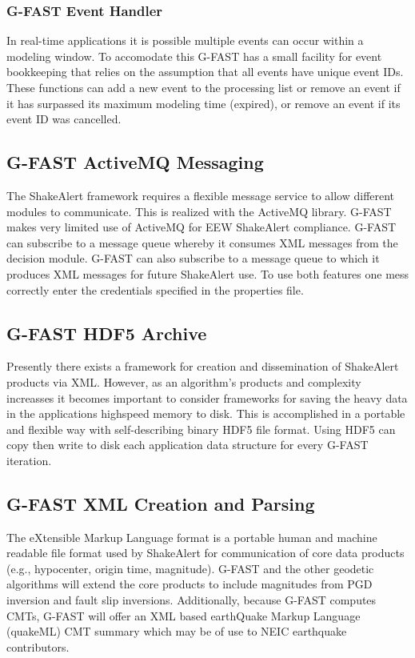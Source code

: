 \documentclass[12pt]{article}
\begin{document}
\subsubsection{G-FAST Event Handler}
In real-time applications it is possible multiple events can occur within a modeling window.  
To accomodate this G-FAST has a small facility for event bookkeeping that
relies on the assumption that all events have unique event IDs.  
These functions can add a new event to the processing list or remove an event if it has surpassed
its maximum modeling time (expired), or remove an event if its event ID was cancelled.

\subsection{G-FAST ActiveMQ Messaging}\label{ss:gfastActiveMQ}
The ShakeAlert framework requires a flexible message service to allow different modules to
communicate.  This is realized with the ActiveMQ library.  G-FAST makes very limited use of
ActiveMQ for EEW ShakeAlert compliance.  G-FAST can subscribe to a message queue whereby it
consumes XML messages from the decision module.  
G-FAST can also subscribe to a message queue to which it produces XML messages for future 
ShakeAlert use.  To use both features one mess correctly enter the credentials specified
in the properties file. 

\subsection{G-FAST HDF5 Archive}\label{ss:gfastHDF5}
Presently there exists a framework for creation and dissemination of ShakeAlert products via
XML.  However, as an algorithm's products and complexity increasses it becomes important to consider
frameworks for saving the heavy data in the applications highspeed memory to disk.  This is
accomplished in a portable and flexible way with self-describing binary HDF5 file format.  Using
HDF5 can copy then write to disk each application data structure for every G-FAST iteration.

\subsection{G-FAST XML Creation and Parsing}\label{ss:gfastXML}
The eXtensible Markup Language format is a portable human and machine readable file format
used by ShakeAlert for communication of core data products (e.g., hypocenter, origin time, magnitude).  
G-FAST and the other geodetic algorithms will extend the core products to include magnitudes from
PGD inversion and fault slip inversions.  Additionally, because G-FAST computes CMTs, G-FAST
will offer an XML based earthQuake Markup Language (quakeML) CMT summary which may be of use to
NEIC earthquake contributors.  
\end{document}
